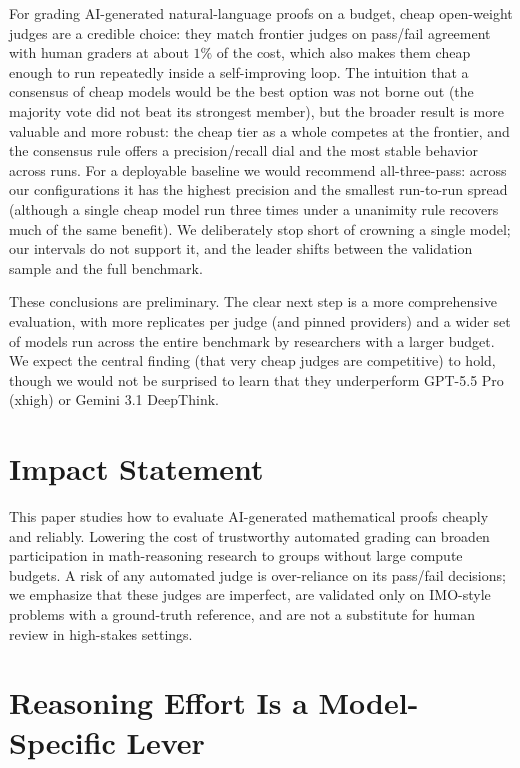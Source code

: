 \documentclass{article}
\begin{document}
For grading AI-generated natural-language proofs on a budget, cheap open-weight
judges are a credible choice: they match frontier judges on pass/fail agreement with
human graders at about $1\%$ of the cost, which also makes them cheap enough to run
repeatedly inside a self-improving loop. The intuition that a consensus of cheap
models would be the best option was not borne out (the majority vote did not beat its
strongest member), but the broader result is more valuable and more robust: the
cheap tier as a whole competes at the frontier, and the consensus rule offers a
precision/recall dial and the most stable behavior across runs. For a deployable
baseline we would recommend all-three-pass: across our configurations it has the
highest precision and the smallest run-to-run spread (although a single cheap model
run three times under a unanimity rule recovers much of the same benefit). We
deliberately stop short of crowning a single model; our intervals do not support it,
and the leader shifts between the validation sample and the full benchmark.

These conclusions are preliminary. The clear next step is a more comprehensive
evaluation, with more replicates per judge (and pinned providers) and a wider set of
models run across the entire benchmark by researchers with a larger budget. We expect
the central finding (that very cheap judges are competitive) to hold, though we would
not be surprised to learn that they underperform GPT-5.5 Pro (xhigh) or Gemini 3.1
DeepThink.

\section*{Impact Statement}

This paper studies how to evaluate AI-generated mathematical proofs cheaply and
reliably. Lowering the cost of trustworthy automated grading can broaden
participation in math-reasoning research to groups without large compute budgets. A
risk of any automated judge is over-reliance on its pass/fail decisions; we emphasize
that these judges are imperfect, are validated only on IMO-style problems with a
ground-truth reference, and are not a substitute for human review in high-stakes
settings.

{\small
  
  
}

\appendix

\section{Reasoning Effort Is a Model-Specific Lever}
\label{app:reasoning}
\end{document}
